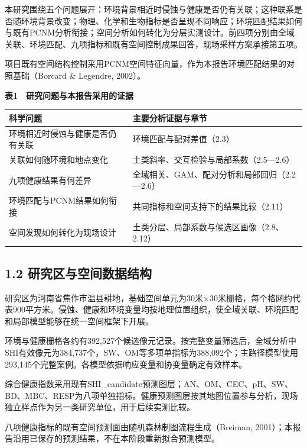 \documentclass[
  11pt,
  a4paper,
]{ctexart}
\begin{document}
本研究围绕五个问题展开：环境背景相近时侵蚀与健康是否仍有关联；这种联系是否随环境背景改变；物理、化学和生物指标是否呈现不同响应；环境匹配结果如何与既有PCNM分析衔接；空间分析如何转化为分层实测设计。前四项分别由全域关联、环境匹配、九项指标和既有空间控制成果回答，现场采样方案承接第五项。

项目既有空间结构控制采用PCNM空间特征向量，作为本报告环境匹配结果的对照基础（Borcard
\& Legendre, 2002）。

\textbf{表1　研究问题与本报告采用的证据}

\begin{longtable}[]{@{}ll@{}}
\toprule
科学问题 & 主要分析证据与章节 \\
\midrule
\endhead
环境相近时侵蚀与健康是否仍有关联 & 环境匹配与配对差值（2.3） \\
关联如何随环境和地点变化 & 土类斜率、交互检验与局部系数（2.5---2.6） \\
九项健康结果有何差异 & 全域相关、GAM、配对分析和局部回归（2.2---2.6） \\
环境匹配与PCNM结果如何衔接 & 共同指标和空间支持下的结果比较（2.11） \\
空间发现如何转化为现场设计 &
土类分层、局部系数与候选区画像（2.8、2.12） \\
\bottomrule
\end{longtable}

\hypertarget{ux7814ux7a76ux533aux4e0eux7a7aux95f4ux6570ux636eux7ed3ux6784}{%
\subsection{1.2
研究区与空间数据结构}\label{ux7814ux7a76ux533aux4e0eux7a7aux95f4ux6570ux636eux7ed3ux6784}}

研究区为河南省焦作市温县耕地，基础空间单元为30米×30米栅格，每个格网约代表900平方米。侵蚀、健康和环境变量均按地理位置组织，使全域关联、环境匹配和局部模型能够在统一空间框架下开展。

环境与健康栅格各约有392,527个候选像元记录。按完整变量筛选后，全域分析中SHI有效像元为384,737个，SW、OM等多项单指标为388,092个；主路径模型使用293,145个完整案例。各模型依据响应变量和协变量确定有效样本。

综合健康指数采用现有SHI\_candidate预测图层；AN、OM、CEC、pH、SW、BD、MBC、RESP为八项单独指标。健康预测图层按其地图位置参与分析，现场独立样点作为另一类研究单位，用于后续实测比较。

八项健康指标的既有空间预测面由随机森林制图流程生成（Breiman,
2001）；本报告沿用已保存的预测结果，不在本阶段重新拟合预测模型。
\end{document}
